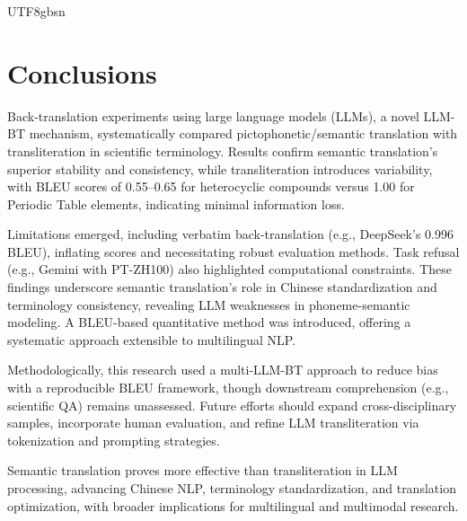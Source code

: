 \documentclass[conference]{IEEEtran}
\begin{document}
\begin{CJK*}{UTF8}{gbsn}
\section{Conclusions}
Back-translation experiments using large language models (LLMs), a novel LLM-BT mechanism, systematically compared pictophonetic/semantic translation with transliteration in scientific terminology. Results confirm semantic translation’s superior stability and consistency, while transliteration introduces variability, with BLEU scores of 0.55–0.65 for heterocyclic compounds versus 1.00 for Periodic Table elements, indicating minimal information loss.

Limitations emerged, including verbatim back-translation (e.g., DeepSeek’s 0.996 BLEU), inflating scores and necessitating robust evaluation methods. Task refusal (e.g., Gemini with PT-ZH100) also highlighted computational constraints. These findings underscore semantic translation’s role in Chinese standardization and terminology consistency, revealing LLM weaknesses in phoneme-semantic modeling. A BLEU-based quantitative method was introduced, offering a systematic approach extensible to multilingual NLP.

Methodologically, this research used a multi-LLM-BT approach to reduce bias with a reproducible BLEU framework, though downstream comprehension (e.g., scientific QA) remains unassessed. Future efforts should expand cross-disciplinary samples, incorporate human evaluation, and refine LLM transliteration via tokenization and prompting strategies.

Semantic translation proves more effective than transliteration in LLM processing, advancing Chinese NLP, terminology standardization, and translation optimization, with broader implications for multilingual and multimodal research.



\end{CJK*}
\end{document}
